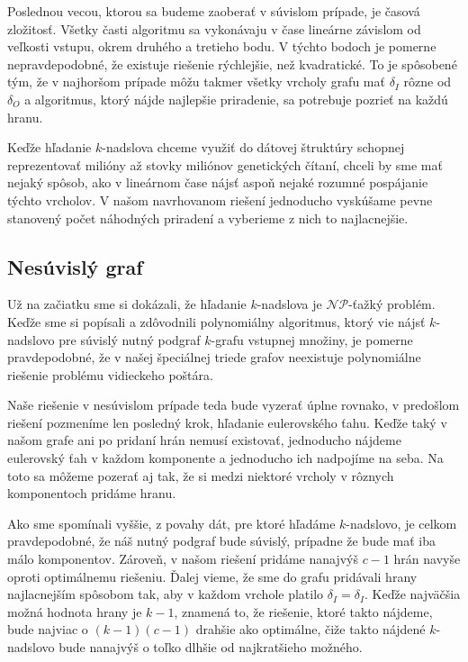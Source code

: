 Poslednou vecou, ktorou sa budeme zaoberať v súvislom prípade, je časová zložitosť. Všetky časti
algoritmu sa vykonávaju v čase lineárne závislom od veľkosti vstupu, okrem druhého a tretieho bodu.
V týchto bodoch je pomerne nepravdepodobné, že existuje riešenie rýchlejšie, než kvadratické. To je
spôsobené tým, že v najhoršom prípade môžu takmer všetky vrcholy grafu mať $\delta_I$ rôzne od $\delta_O$
a algoritmus, ktorý nájde najlepšie priradenie, sa potrebuje pozrieť na každú hranu.

Keďže hľadanie
$k$-nadslova chceme využiť do dátovej štruktúry schopnej reprezentovať milióny až stovky miliónov
genetických čítaní, chceli by sme mať nejaký spôsob, ako v lineárnom čase nájsť aspoň nejaké rozumné
pospájanie týchto vrcholov. V našom navrhovanom riešení jednoducho vyskúšame pevne stanovený počet
náhodných priradení a vyberieme z nich to najlacnejšie.

\subsection{Nesúvislý graf}

Už na začiatku sme si dokázali, že hľadanie $k$-nadslova je $\mathcal{NP}$-ťažký problém. Keďže
sme si popísali a zdôvodnili polynomiálny algoritmus, ktorý vie nájsť $k$-nadslovo pre súvislý
nutný podgraf $k$-grafu vstupnej množiny, je pomerne pravdepodobné, že v našej špeciálnej
triede grafov neexistuje polynomiálne riešenie problému vidieckeho poštára.

Naše riešenie v nesúvislom prípade teda bude vyzerať úplne rovnako, v predošlom
riešení pozmeníme len posledný krok, hľadanie eulerovského ťahu. Keďže taký v našom grafe
ani po pridaní hrán nemusí existovať, jednoducho nájdeme eulerovský ťah v každom komponente
a jednoducho ich nadpojíme na seba. Na toto sa môžeme pozerať aj tak, že si medzi niektoré
vrcholy v rôznych komponentoch pridáme hranu.

Ako sme spomínali vyššie, z povahy dát, pre ktoré hľadáme $k$-nadslovo,
je celkom pravdepodobné, že náš nutný podgraf bude súvislý, prípadne že bude mať iba málo
komponentov. Zároveň, v našom riešení pridáme nanajvýš $c - 1$ hrán navyše oproti
optimálnemu riešeniu. Ďalej vieme, že sme do grafu pridávali hrany najlacnejším spôsobom
tak, aby v každom vrchole platilo $\delta_I = \delta_I$. Keďže najväčšia možná hodnota
hrany je $k-1$, znamená to, že riešenie, ktoré takto nájdeme, bude najviac o $(k - 1)(c - 1)$ drahšie
ako optimálne, čiže takto nájdené $k$-nadslovo bude nanajvýš o toľko dlhšie od najkratšieho možného.

